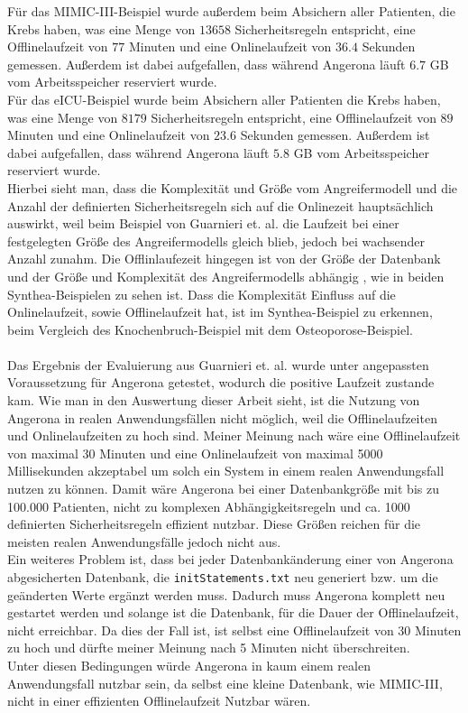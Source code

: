 \documentclass[german,version-2020-11]{uzl-thesis}
\begin{document}
Für das MIMIC-III-Beispiel wurde außerdem beim Absichern aller Patienten, die Krebs haben, was eine Menge von $13658$ Sicherheitsregeln entspricht, eine Offlinelaufzeit von $77$ Minuten und eine Onlinelaufzeit von $36.4$ Sekunden gemessen. Außerdem ist dabei aufgefallen, dass während Angerona läuft $6.7$ GB vom Arbeitsspeicher reserviert wurde. \\ 
Für das eICU-Beispiel wurde beim Absichern aller Patienten die Krebs haben, was eine Menge von $8179$ Sicherheitsregeln entspricht, eine Offlinelaufzeit von $89$ Minuten und eine Onlinelaufzeit von $23.6$ Sekunden gemessen. Außerdem ist dabei aufgefallen, dass während Angerona läuft $5.8$ GB vom Arbeitsspeicher reserviert wurde. \\ 
Hierbei sieht man, dass die Komplexität und Größe vom Angreifermodell und die Anzahl der definierten Sicherheitsregeln sich auf die Onlinezeit hauptsächlich auswirkt, weil beim Beispiel von Guarnieri et. al. \cite{guarnieri2017securing} die Laufzeit bei einer festgelegten Größe des Angreifermodells gleich blieb, jedoch bei wachsender Anzahl zunahm. Die Offlinlaufezeit hingegen ist von der Größe der Datenbank und der Größe und Komplexität des Angreifermodells abhängig , wie in beiden Synthea-Beispielen zu sehen ist. Dass die Komplexität Einfluss auf die Onlinelaufzeit, sowie Offlinelaufzeit hat, ist im Synthea-Beispiel zu erkennen, beim Vergleich des Knochenbruch-Beispiel mit dem Osteoporose-Beispiel.
 \\ \\ 
Das Ergebnis der Evaluierung aus Guarnieri et. al. \cite{guarnieri2017securing} wurde unter angepassten Voraussetzung für Angerona getestet, wodurch die positive Laufzeit zustande kam. Wie man in den Auswertung dieser Arbeit sieht, ist die Nutzung von Angerona in realen Anwendungsfällen nicht möglich, weil die Offlinelaufzeiten und Onlinelaufzeiten zu hoch sind. Meiner Meinung nach wäre eine Offlinelaufzeit von maximal 30 Minuten und eine Onlinelaufzeit von maximal 5000 Millisekunden akzeptabel um solch ein System in einem realen Anwendungsfall nutzen zu können. Damit wäre Angerona bei einer Datenbankgröße mit bis zu 100.000 Patienten, nicht zu komplexen Abhängigkeitsregeln und ca. 1000 definierten Sicherheitsregeln effizient nutzbar. Diese Größen reichen für die meisten realen Anwendungsfälle jedoch nicht aus. \\ 
Ein weiteres Problem ist, dass bei jeder Datenbankänderung einer von Angerona abgesicherten Datenbank, die \texttt{initStatements.txt} neu generiert bzw. um die geänderten Werte ergänzt werden muss. Dadurch muss Angerona komplett neu gestartet werden und solange ist die Datenbank, für die Dauer der Offlinelaufzeit, nicht erreichbar. Da dies der Fall ist, ist selbst eine Offlinelaufzeit von 30 Minuten zu hoch und dürfte meiner Meinung nach 5 Minuten nicht überschreiten. \\ Unter diesen Bedingungen würde Angerona in kaum einem realen Anwendungsfall nutzbar sein, da selbst eine kleine Datenbank, wie MIMIC-III, nicht in einer effizienten Offlinelaufzeit Nutzbar wären. \\ 
\end{document}
